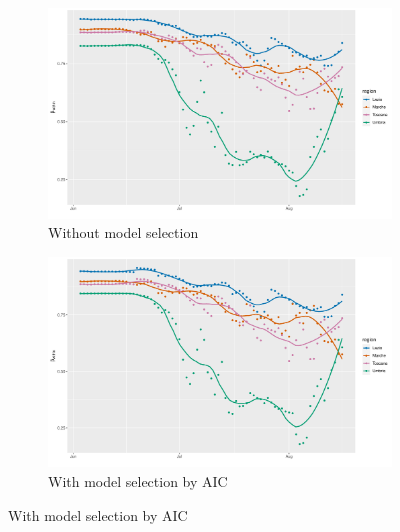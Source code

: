 \documentclass[12pt]{article}
\begin{document}
\begin{appendices}
		\begin{figure}[H]
    	    \centering
    	    \begin{subfigure}{\textwidth}
    	      \centering
    	      \includegraphics[width=0.95\linewidth]{output/model1_lag3_betawithin_Centro (IT)_rolling.pdf}
    	      \caption{Without model selection}
    	      \label{fig:beta_within_over_time_centro_regular}
    	    \end{subfigure}\newline
    	    \begin{subfigure}{\textwidth}
    	      \centering
    	      \includegraphics[width=0.95\linewidth]{output/model1_lag3_betawithin_Centro (IT)_aic_rolling.pdf}
    	      \caption{With model selection by AIC}
    	      \label{fig:beta_within_over_time_centro_aic}
    	    \end{subfigure}
    	\end{figure}
        \begin{figure}[H]\ContinuedFloat
    	    \begin{subfigure}{\textwidth}
    	      \centering

\end{subfigure}
\end{figure}
\end{appendices}
\end{document}
